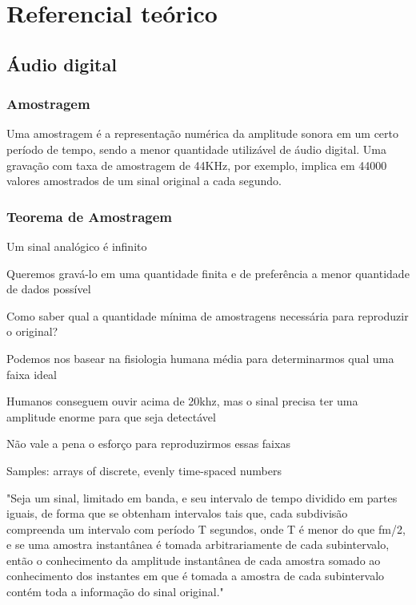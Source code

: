 \chapter{Referencial teórico}\label{cap:referencialTeorico}

\section{Áudio digital}

\subsection{Amostragem}
Uma amostragem é a representação numérica da amplitude sonora em um certo período de tempo, sendo a menor quantidade utilizável de áudio digital. Uma gravação com taxa de amostragem de 44KHz, por exemplo, implica em 44000 valores amostrados de um sinal original a cada segundo.

\subsection{Teorema de Amostragem}
\color{orange}
Um sinal analógico é infinito

Queremos gravá-lo em uma quantidade finita e de preferência a menor quantidade de dados possível

Como saber qual a quantidade mínima de amostragens necessária para reproduzir o original?

Podemos nos basear na fisiologia humana média para determinarmos qual uma faixa ideal

Humanos conseguem ouvir acima de 20khz, mas o sinal precisa ter uma amplitude enorme para que seja detectável

Não vale a pena o esforço para reproduzirmos essas faixas

Samples: arrays of discrete, evenly time-spaced numbers

\begin{displayquote}
"Seja um sinal, limitado em banda, e seu intervalo de tempo dividido em partes iguais, de forma que se obtenham intervalos tais que, cada subdivisão compreenda um intervalo com período T segundos, onde T é menor do que fm/2, e se uma amostra instantânea é tomada arbitrariamente de cada subintervalo, então o conhecimento da amplitude instantânea de cada amostra somado ao conhecimento dos instantes em que é tomada a amostra de cada subintervalo contém toda a informação do sinal original."
\end{displayquote}

